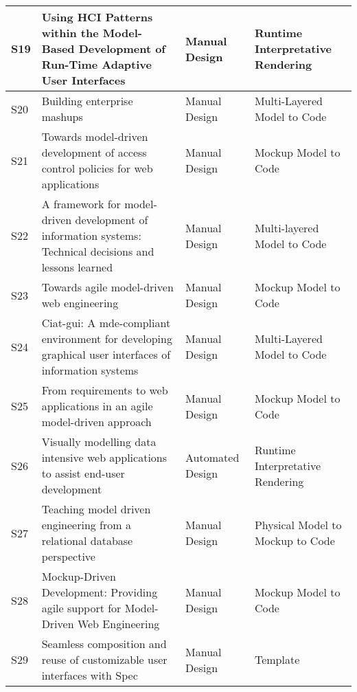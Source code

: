 \begin{table*}[ht!]
\begin{tabular}{ | p{0.3cm} | p{9.5cm} | p{2.2cm} |  p{4.2cm} |}
S19 &  Using HCI Patterns within the Model-Based Development of Run-Time Adaptive User Interfaces~\cite{SEISSLER2010477} & Manual Design & Runtime Interpretative Rendering \\ \hline

S20 &  Building enterprise mashups~\cite{DEVRIEZE2011637} & Manual Design & Multi-Layered Model to Code \\ \hline


S21 &  Towards model-driven development of access control policies for web applications~\cite{Busch12}  & Manual Design  & Mockup Model to Code \\ \hline

S22 &  A framework for model-driven development of information systems: Technical decisions and lessons learned~\cite{Vara12} & Manual Design & Multi-layered Model to Code \\ \hline

S23 &  Towards agile model-driven  web  engineering~\cite{Rivero12} & Manual Design  & Mockup Model to Code \\ \hline

S24 & Ciat-gui:  A  mde-compliant  environment  for  developing  graphical  user interfaces of information systems ~\cite{Molina12} & Manual Design  & Multi-Layered Model to Code \\ \hline

S25 &  From requirements to web applications in an agile model-driven approach~\cite{Grigera12} & Manual Design  & Mockup Model to Code \\ \hline

S26 &  Visually modelling data intensive web applications to assist end-user development~\cite{Deufemia13} & Automated Design  & Runtime Interpretative Rendering \\ \hline

S27 &  Teaching model driven engineering from a relational database perspective~\cite{Batory13MODELS} & Manual Design & Physical Model to Mockup to Code \\ \hline

S28 &  Mockup-Driven Development: Providing agile support for Model-Driven Web Engineering~\cite{Rivero2014} & Manual Design  & Mockup Model to Code \\ \hline


S29 &  Seamless composition and reuse of customizable user interfaces with Spec~\cite{VANRYSEGHEM201434}	& Manual Design & Template \\ \hline


\end{tabular}
\end{table*}
